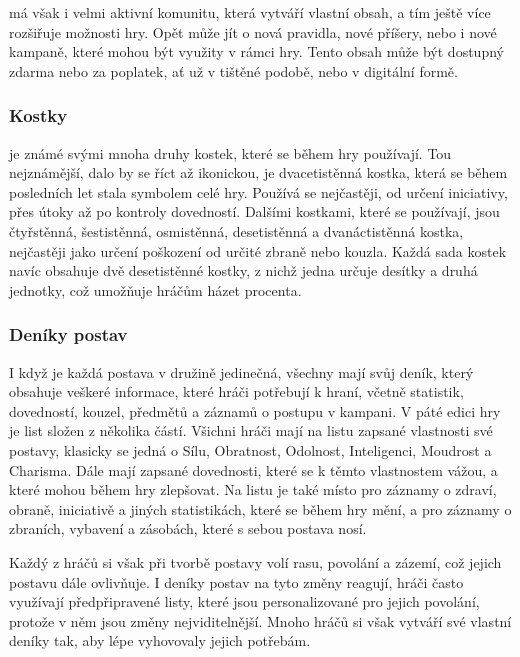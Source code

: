 \dnd{} má však i velmi aktivní komunitu, která vytváří vlastní obsah, a tím ještě více rozšiřuje možnosti hry. Opět může jít o nová pravidla, nové příšery, nebo i nové kampaně, které mohou být využity v rámci hry. Tento obsah může být dostupný zdarma nebo za poplatek, ať už v tištěné podobě, nebo v digitální formě.

\subsubsection*{Kostky}
\label{subsubsec:dnd_comp_dice}

\dnd{} je známé svými mnoha druhy kostek, které se během hry používají. Tou nejznámější, dalo by se říct až ikonickou, je dvacetistěnná kostka, která se během posledních let stala symbolem celé hry. Používá se nejčastěji, od určení iniciativy, přes útoky až po kontroly dovedností. Dalšími kostkami, které se používají, jsou čtyřstěnná, šestistěnná, osmistěnná, desetistěnná a dvanáctistěnná kostka, nejčastěji jako určení poškození od určité zbraně nebo kouzla. Každá sada kostek navíc obsahuje dvě desetistěnné kostky, z nichž jedna určuje desítky a druhá jednotky, což umožňuje hráčům házet procenta.

\subsubsection*{Deníky postav}
\label{subsubsec:dnd_comp_sheets}

I když je každá postava v družině jedinečná, všechny mají svůj deník, který obsahuje veškeré informace, které hráči potřebují k hraní, včetně statistik, dovedností, kouzel, předmětů a záznamů o postupu v kampani. V páté edici hry je list složen z několika částí. Všichni hráči mají na listu zapsané vlastnosti své postavy, klasicky se jedná o Sílu, Obratnost, Odolnost, Inteligenci, Moudrost a Charisma. Dále mají zapsané dovednosti, které se k těmto vlastnostem vážou, a které mohou během hry zlepšovat. Na listu je také místo pro záznamy o zdraví, obraně, iniciativě a jiných statistikách, které se během hry mění, a pro záznamy o zbraních, vybavení a zásobách, které s sebou postava nosí.

Každý z hráčů si však při tvorbě postavy volí rasu, povolání a zázemí, což jejich postavu dále ovlivňuje. I deníky postav na tyto změny reagují, hráči často využívají předpřipravené listy, které jsou personalizované pro jejich povolání, protože v něm jsou změny nejviditelnější. Mnoho hráčů si však vytváří své vlastní deníky tak, aby lépe vyhovovaly jejich potřebám.

